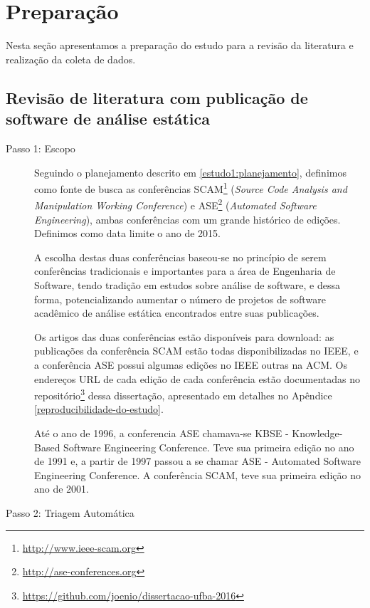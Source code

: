 
\section{Preparação} \label{estudo1:preparacao} %

Nesta seção apresentamos a preparação do estudo para a revisão da literatura
e realização da coleta de
dados.

\subsection{Revisão de literatura com publicação de software de análise estática}

\begin{description}
  \item [Passo 1: Escopo]

Seguindo o planejamento descrito em \ref{estudo1:planejamento}, definimos como
fonte de busca as conferências SCAM\footnote{\url{http://www.ieee-scam.org}}
({\it Source Code Analysis and Manipulation Working Conference}) e
ASE\footnote{\url{http://ase-conferences.org}} ({\it Automated Software
Engineering}), ambas conferências com um grande histórico de edições. Definimos
como data limite o ano de 2015.

A escolha destas duas conferências baseou-se no princípio de serem conferências
tradicionais e importantes para a área de Engenharia de Software, tendo tradição
em estudos sobre análise de software, e dessa forma, potencializando aumentar
o número de projetos de software acadêmico de análise estática encontrados
entre suas publicações.

Os artigos das duas conferências estão disponíveis para download:
as publicações da conferência SCAM estão todas disponibilizadas no IEEE, e
a conferência ASE possui algumas edições no IEEE outras na ACM. Os endereços URL
de cada edição de cada conferência estão documentadas no
repositório\footnote{\url{https://github.com/joenio/dissertacao-ufba-2016}}
dessa dissertação, apresentado em detalhes no Apêndice
\ref{reproducibilidade-do-estudo}.

Até o ano de 1996, a conferencia ASE chamava-se KBSE - Knowledge-Based Software
Engineering Conference. Teve sua primeira edição no ano de 1991 e, a partir de 1997 
passou a se chamar  ASE - Automated Software Engineering Conference.
A conferência SCAM, teve sua primeira edição no ano de 2001.

  \item [Passo 2: Triagem Automática]


\end{description}
